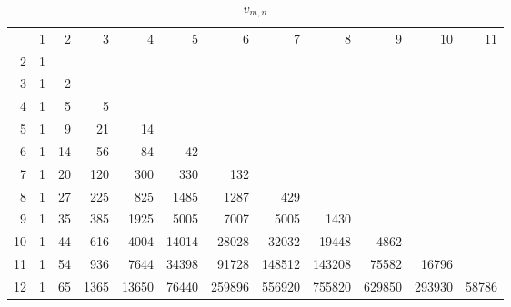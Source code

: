 \documentclass[10pt]{amsart}
\begin{document}
    \begin{table}[h]
    {\scriptsize \begin{tabular}{|r|rrrrrrrrrrr|} \hline
    & 1 & 2 & 3 & 4 & 5 & 6 & 7 & 8 & 9 & 10 & 11 \\
    2 & 1 &&&&&&&&&& \\
    3 & 1 & 2 &&&&&&&&& \\
    4 & 1 & 5 & 5 &&&&&&&& \\
    5 & 1 & 9 & 21 & 14 &&&&&&& \\
    6 & 1 & 14 & 56 & 84 & 42 &&&&&& \\
    7 & 1 & 20 & 120 & 300 & 330 & 132 &&&&& \\
    8 & 1 & 27 & 225 & 825 & 1485 & 1287 & 429 &&&& \\
    9 & 1 & 35 & 385 & 1925 & 5005 & 7007 & 5005 & 1430 &&& \\
    10 & 1 & 44 & 616 & 4004 & 14014 & 28028 & 32032 & 19448 & 4862 && \\
    11 & 1 & 54 & 936 & 7644 & 34398 & 91728 & 148512 & 143208 & 75582 & 16796 & \\
    12 & 1 & 65 & 1365 & 13650 & 76440 & 259896 & 556920 & 755820 & 629850 & 293930 & 58786 \\ \hline
    
    
    \end{tabular}}
    \vspace{.2cm}
    \caption{$v_{m,n}$}
    \label{v-mn}
    \end{table}
    
\end{document}
